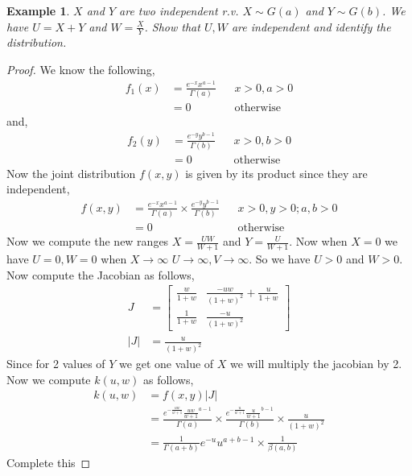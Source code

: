 \documentclass[oneside,11pt,pdftex]{book}%
\numberwithin{equation}{section}
\newtheorem{example}[theorem]{Example}
\numberwithin{section}{chapter}
\numberwithin{equation}{chapter}
\begin{document}
\begin{example}
	$ X $ and $ Y $ are two independent r.v. $ X \sim G(a) $ and $ Y\sim G(b) $. We have $ U=X+Y $ and $ W=\frac{X}{Y} $. Show that $ U, W $ are independent and identify the distribution.
\end{example}
\begin{proof}
	We know the following,
\begin{align*}
	f_1(x)&= \frac{e^{-x} x^{a -1}}{\Gamma (a )} && x>0, a >0\\
	&=0 && \text{otherwise}
\end{align*}
and,
\begin{align*}
	f_2(y)&= \frac{e^{-y} y^{b -1}}{\Gamma (b)} && x>0, b >0\\
	&=0 && \text{otherwise}
\end{align*}
Now the joint distribution $ f(x,y) $ is given by its product since they are independent,
\begin{align*}
	f(x,y)&=\frac{e^{-x} x^{a -1}}{\Gamma (a )} \times \frac{e^{-y} y^{b -1}}{\Gamma (b)} && x>0,y>0; a,b >0\\
	&=0 && \text{otherwise}
\end{align*}
Now we compute the new ranges $ X = \frac{UW}{W+1}$ and $ Y=\frac{U}{W+1} $.
Now when $ X=0 $ we have $ U=0, W=0 $ when $ X\rightarrow \infty $ $ U \rightarrow \infty, V \rightarrow \infty $. So we have $ U>0 $ and $ W>0 $.\\
Now compute the Jacobian as follows,
\begin{align*}
	J&= \begin{bmatrix}
		\frac{w}{1+w} & \frac{-uw}{(1+w)^2}+\frac{u}{1+w}\\
		\frac{1}{1+w} & \frac{-u}{(1+w)^2}
	\end{bmatrix}\\
	|J|&=\frac{u}{(1+w)^2}
\end{align*}
Since for 2 values of $ Y $ we get one value of $ X $ we will multiply the jacobian by 2. Now we compute $ k(u,w) $ as follows,
\begin{align*}
	k(u,w)&=f(x,y)|J|\\
	&=\frac{e^{-\frac{uw}{w+1}} \frac{uw}{w+1}^{a -1}}{\Gamma (a )} \times \frac{e^{-\frac{u}{w+1}} \frac{u}{w+1}^{b -1}}{\Gamma (b)} \times \frac{u}{(1+w)^2}\\
	&=\frac{1}{\Gamma(a+b)}e^{-u}u^{a+b-1} \times \frac{1}{\beta(a,b)}
\end{align*}
Complete this 
\end{proof}
\end{document}
